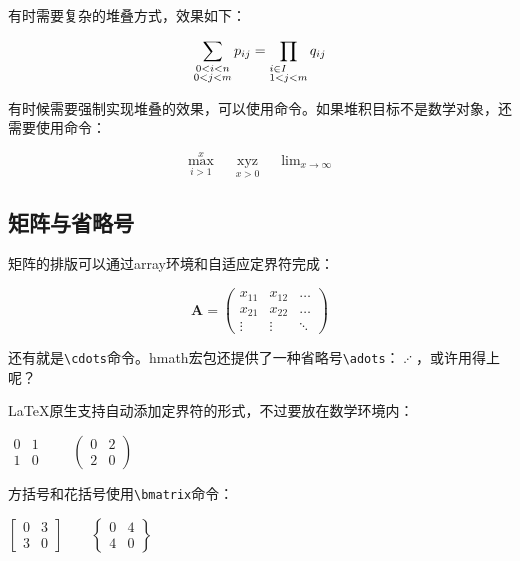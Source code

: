 {有时需要复杂的堆叠方式，效果如下：

\begin{codeshow}
\[\sum_{\substack{0<i<n \\
  0<j<m}} p_{ij}=
  \prod_{\begin{subarray}{l}
  i\in I \\  1<j<m
  \end{subarray}}q_{ij}\]
\end{codeshow}

有时候需要强制实现堆叠的效果，可以使用\latexline{\\limits}命令。如果堆积目标不是数学对象，还需要使用\latexline{\\mathop}命令：

\begin{codeshow}
\[\max\limits_{i>1}^{x}\quad
\mathop{xyz}\limits_{x>0}\quad
\lim\nolimits_{x\to \infty}\]
\end{codeshow}

\subsection{矩阵与省略号}
矩阵的排版可以通过array环境和自适应定界符完成：

\begin{codeshow}
\[\mathbf{A}=
\left(\begin{array}{ccc}
x_{11} & x_{12} & \ldots \\
x_{21} & x_{22} & \ldots \\
\vdots & \vdots & \ddots
\end{array}\right)\]
\end{codeshow}

还有就是\verb|\cdots|命令。hmath宏包还提供了一种省略号\verb|\adots|：$\adots$，或许用得上呢？

\LaTeX 原生支持自动添加定界符的形式，不过要放在数学环境内：

\begin{codeshow}
\centering $\begin{matrix}
0 & 1 \\ 1 & 0 \end{matrix}\qquad
\begin{pmatrix} 0 & 2 \\
2 & 0 \end{pmatrix}$
\end{codeshow}

方括号和花括号使用\verb|\bmatrix|命令：

\begin{codeshow}
\centering $\begin{bmatrix}
0 & 3 \\ 3 & 0 \end{bmatrix}\qquad
\begin{Bmatrix} 0 & 4 \\
4 & 0 \end{Bmatrix}$
\end{codeshow}

}
